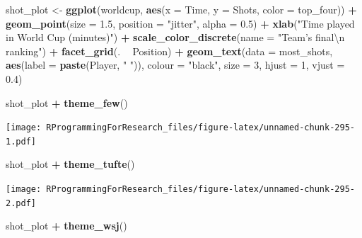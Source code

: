 \documentclass[]{book}
\makeatletter
\newenvironment{Shaded}{\begin{snugshade}}{\end{snugshade}}
\newcommand{\KeywordTok}[1]{\textcolor[rgb]{0.13,0.29,0.53}{\textbf{#1}}}
\newcommand{\DataTypeTok}[1]{\textcolor[rgb]{0.13,0.29,0.53}{#1}}
\newcommand{\DecValTok}[1]{\textcolor[rgb]{0.00,0.00,0.81}{#1}}
\newcommand{\FloatTok}[1]{\textcolor[rgb]{0.00,0.00,0.81}{#1}}
\newcommand{\CharTok}[1]{\textcolor[rgb]{0.31,0.60,0.02}{#1}}
\newcommand{\StringTok}[1]{\textcolor[rgb]{0.31,0.60,0.02}{#1}}
\newcommand{\OperatorTok}[1]{\textcolor[rgb]{0.81,0.36,0.00}{\textbf{#1}}}
\newcommand{\NormalTok}[1]{#1}
\newenvironment{kframe}{%
\medskip{}
\setlength{\fboxsep}{.8em}
 \def\at@end@of@kframe{}%
 \ifinner\ifhmode%
  \def\at@end@of@kframe{\end{minipage}}%
  \begin{minipage}{\columnwidth}%
 \fi\fi%
 \def\FrameCommand##1{\hskip\@totalleftmargin \hskip-\fboxsep
 \colorbox{shadecolor}{##1}\hskip-\fboxsep
     \hskip-\linewidth \hskip-\@totalleftmargin \hskip\columnwidth}%
 \MakeFramed {\advance\hsize-\width
   \@totalleftmargin\z@ \linewidth\hsize
   \@setminipage}}%
 {\par\unskip\endMakeFramed%
 \at@end@of@kframe}
\renewenvironment{Shaded}{\begin{kframe}}{\end{kframe}}
\theoremstyle{definition}
\theoremstyle{definition}
\theoremstyle{definition}
\theoremstyle{remark}
\makeatother
\begin{document}
\begin{Shaded}
\begin{Highlighting}[]
\NormalTok{shot_plot <-}\StringTok{ }\KeywordTok{ggplot}\NormalTok{(worldcup, }\KeywordTok{aes}\NormalTok{(}\DataTypeTok{x =}\NormalTok{ Time, }\DataTypeTok{y =}\NormalTok{ Shots,}
                     \DataTypeTok{color =}\NormalTok{ top_four)) }\OperatorTok{+}
\StringTok{        }\KeywordTok{geom_point}\NormalTok{(}\DataTypeTok{size =} \FloatTok{1.5}\NormalTok{, }\DataTypeTok{position =} \StringTok{"jitter"}\NormalTok{,}
                   \DataTypeTok{alpha =} \FloatTok{0.5}\NormalTok{)  }\OperatorTok{+}\StringTok{ }
\StringTok{        }\KeywordTok{xlab}\NormalTok{(}\StringTok{"Time played in World Cup (minutes)"}\NormalTok{) }\OperatorTok{+}\StringTok{ }
\StringTok{        }\KeywordTok{scale_color_discrete}\NormalTok{(}\DataTypeTok{name =} \StringTok{"Team's final}\CharTok{\textbackslash{}n}\StringTok{ ranking"}\NormalTok{) }\OperatorTok{+}\StringTok{ }
\StringTok{        }\KeywordTok{facet_grid}\NormalTok{(. }\OperatorTok{~}\StringTok{ }\NormalTok{Position) }\OperatorTok{+}\StringTok{ }
\StringTok{        }\KeywordTok{geom_text}\NormalTok{(}\DataTypeTok{data =}\NormalTok{ most_shots,}
                  \KeywordTok{aes}\NormalTok{(}\DataTypeTok{label =} \KeywordTok{paste}\NormalTok{(Player, }\StringTok{" "}\NormalTok{)),}
                  \DataTypeTok{colour =} \StringTok{"black"}\NormalTok{, }\DataTypeTok{size =} \DecValTok{3}\NormalTok{,}
                  \DataTypeTok{hjust =} \DecValTok{1}\NormalTok{, }\DataTypeTok{vjust =} \FloatTok{0.4}\NormalTok{)}

\NormalTok{shot_plot }\OperatorTok{+}\StringTok{ }\KeywordTok{theme_few}\NormalTok{()}
\end{Highlighting}
\end{Shaded}

\texttt{[image: RProgrammingForResearch\_files/figure-latex/unnamed-chunk-295-1.pdf]}

\begin{Shaded}
\begin{Highlighting}[]
\NormalTok{shot_plot }\OperatorTok{+}\StringTok{ }\KeywordTok{theme_tufte}\NormalTok{()}
\end{Highlighting}
\end{Shaded}

\texttt{[image: RProgrammingForResearch\_files/figure-latex/unnamed-chunk-295-2.pdf]}

\begin{Shaded}
\begin{Highlighting}[]
\NormalTok{shot_plot }\OperatorTok{+}\StringTok{ }\KeywordTok{theme_wsj}\NormalTok{()}
\end{Highlighting}
\end{Shaded}
\end{document}
